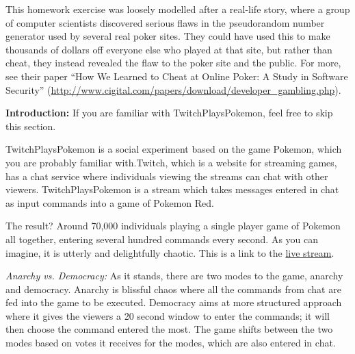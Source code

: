 \documentclass[]{article}
\begin{document}
\begin{qunlist}
{{
This homework exercise was loosely modelled after a real-life story, where a group of computer scientists discovered serious flaws in the pseudorandom number generator used by several real poker sites. They could have used this to make thousands of dollars off everyone else who played at that site, but rather than cheat, they instead revealed the flaw to the poker site and the public. For more, see their paper
``How We Learned to Cheat at Online Poker: A Study in Software Security''
(\url{http://www.cigital.com/papers/download/developer_gambling.php}).

}}\fi





\textbf{Introduction:} If you are familiar with TwitchPlaysPokemon, feel free to skip this section.

TwitchPlaysPokemon is a social experiment based on the game Pokemon, which you are probably familiar with.Twitch, which is a website for streaming games, has a chat service where individuals viewing the streams can chat with other viewers. TwitchPlaysPokemon is a stream which takes messages entered in chat as input commands into a game of Pokemon Red.

The result? Around 70,000 individuals playing a single player game of Pokemon all together, entering several hundred commands every second. As you can imagine, it is utterly and delightfully chaotic. This is a link to the \href{http://www.twitch.tv/twitchplayspokemon}{live stream}.

\textit{Anarchy vs. Democracy:}
As it stands, there are two modes to the game, anarchy and democracy. Anarchy is blissful chaos where all the commands from chat are fed into the game to be executed. Democracy aims at more structured approach where it gives the viewers a 20 second window to enter the commands; it will then choose the command entered the most. The game shifts between the two modes based on votes it receives for the modes, which are also entered in chat.


\end{qunlist}
\end{document}
